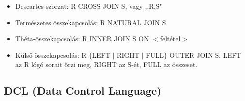 \documentclass[tikz,12pt,margin=0px]{article}
\begin{document}

	\begin{itemize}
		\item Descartes-szorzat: R CROSS JOIN S, vagy ,,R,S"
		\item Természetes összekapcsolás: R NATURAL JOIN S
		\item Théta-összekapcsolás: R INNER JOIN S ON $<$feltétel$>$
		\item Külső összekapcsolás: R $\{$LEFT $|$ RIGHT $|$ FULL$\}$ OUTER JOIN S. LEFT az R lógó sorait őrzi meg, RIGHT az S-ét, FULL az összeset.\\
	\end{itemize}

    \subsection*{DCL (Data Control Language)}
\end{document}
